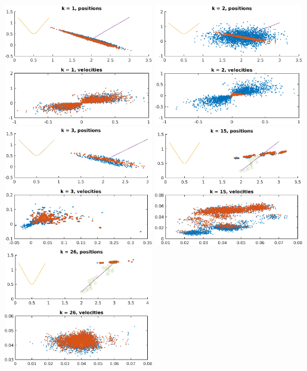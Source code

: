 \documentclass[english,DIV=13]{scrartcl}
\begin{document}
\begin{center}
   \includegraphics[width=0.49\textwidth]{img/q4_1.png}
   \includegraphics[width=0.49\textwidth]{img/q4_2.png}
   \includegraphics[width=0.49\textwidth]{img/q4_3.png}
   \includegraphics[width=0.49\textwidth]{img/q4_15.png}
   \includegraphics[width=0.49\textwidth]{img/q4_26.png}
\end{center}
\end{document}
